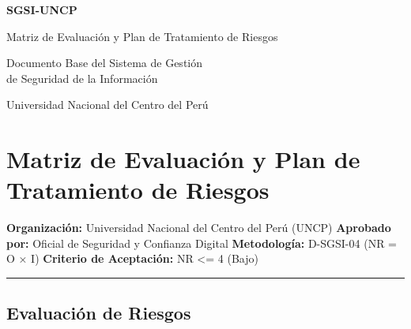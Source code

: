 \documentclass[10pt,letterpaper]{article}
\newcommand{\makecover}{
\begin{titlepage}
\centering
\vspace*{2cm}
{\Huge\bfseries\color{uncpblue} SGSI-UNCP\par}
\vspace{0.7cm}
{\LARGE Matriz de Evaluación y Plan de Tratamiento de Riesgos\par}
\vspace{0.5cm}
{\large Documento Base del Sistema de Gestión\\de Seguridad de la Información\par}
\vspace{1.5cm}
{\small Universidad Nacional del Centro del Perú\par}
\vfill
\end{titlepage}
}
\begin{document}
\makecover
\setcounter{tocdepth}{2}
\RaggedRight
\tableofcontents
\newpage

\RaggedRight
\section{Matriz de Evaluación y Plan de Tratamiento de
Riesgos}\label{matriz-de-evaluaciuxf3n-y-plan-de-tratamiento-de-riesgos}

\textbf{Organización:} Universidad Nacional del Centro del Perú (UNCP)
\textbf{Aprobado por:} Oficial de Seguridad y Confianza Digital
\textbf{Metodología:} D-SGSI-04 (NR = O × I) \textbf{Criterio de
Aceptación:} NR \textless= 4 (Bajo)

\begin{center}\rule{0.5\linewidth}{0.5pt}\end{center}

\subsection{Evaluación de Riesgos}\label{evaluaciuxf3n-de-riesgos}
\end{document}
